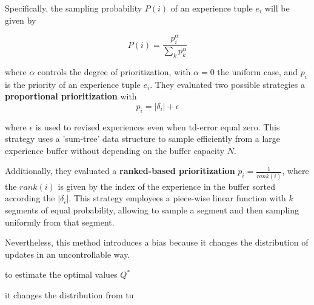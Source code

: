 Specifically, the sampling probability $P(i)$ of an experience tuple $e_i$ will be given by

\begin{equation}
    P(i) = \frac{p_i^\alpha}{\sum_k p_k^\alpha}
\end{equation}

where $\alpha$ controls the degree of prioritization, with $\alpha = 0$ the uniform case, and $p_i$ is the priority of an experience tuple $e_i$. They evaluated two possible strategies a \textbf{proportional prioritization} with 
\begin{equation}
    p_i = | \delta_i | + \epsilon
\end{equation}

where $\epsilon$ is used to revised experiences even when td-error equal zero. This strategy uses a 'sum-tree' data structure to sample efficiently from a large experience buffer without depending on the buffer capacity $N$.

Additionally, they evaluated a \textbf{ranked-based prioritization} $p_i = \frac{1}{rank(i)}$, where the $rank(i)$ is given by the index of the experience in the buffer sorted according the $| \delta_i |$. This strategy employees a piece-wise linear function with $k$ segments of equal probability, allowing to sample a segment and then sampling uniformly from that segment.

Nevertheless, this method introduces a bias because it changes the distribution of updates in an uncontrollable way.


to estimate the optimal values $Q^*$ 

it changes the distribution from tu


